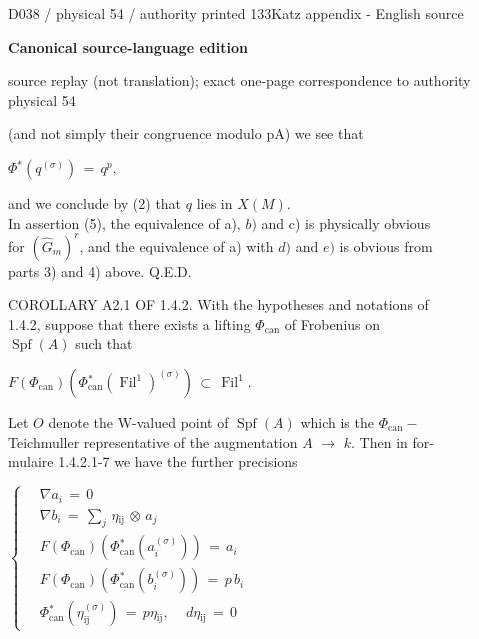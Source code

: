 \documentclass[9pt]{article}
\newcommand{\CanonHeading}[1]{\par\vspace{1.5pt}{\fontsize{8.6}{10.0}\selectfont\sffamily\bfseries\color{Accent} #1\par}\vspace{1.5pt}}
\newcommand{\CanonText}[1]{\par{\fontsize{8.0}{9.35}\selectfont\RaggedRight #1\par}\vspace{2.2pt}}
\newcommand{\CanonDisplay}[1]{\par\vspace{1.2pt}\begin{center}{\fontsize{7.2}{8.4}\selectfont\(\displaystyle #1\)}\end{center}\vspace{1.2pt}}
\newenvironment{CanonMathBlock}{\par\vspace{1.2pt}\begin{center}\fontsize{6.8}{8.0}\selectfont\(\displaystyle}{\)\end{center}\vspace{1.2pt}}
\newcommand{\LayerTitle}{Canonical source-language edition}
\begin{document}
\noindent\begin{minipage}[t][\dimexpr\textheight-5pt\relax][t]{\textwidth}
{\sffamily\fontsize{7.3}{8.2}\selectfont\color{Quiet} D038 / physical 54 / authority printed 133\hfill Katz appendix - English source}
\par{}\vspace{4.5pt}
{\sffamily\fontsize{10.4}{11.6}\selectfont\bfseries\color{Accent} \LayerTitle}
\par{\sffamily\fontsize{6.7}{7.7}\selectfont\color{Quiet} source replay (not translation); exact one-page correspondence to authority physical 54}
\vspace{5pt}
\CanonText{(and not simply their congruence modulo pA) we see that}
\CanonDisplay{\Phi{}^{*}(q^{(\sigma{})})\,=\,q^{p},}
\CanonText{and we conclude by (2) that \(q\) lies in \(X(M)\).\\In assertion (5), the equivalence of a), \(b)\) and c) is physically obvious\\for \((\widehat{G}_{m})^{r}\), and the equivalence of a) with \(d)\) and \(e)\) is obvious from\\parts 3) and 4) above. Q.E.D.}
\CanonHeading{A2. SHARPENINGS OF 1.4}
\CanonText{COROLLARY A2.1 OF 1.4.2. With the hypotheses and notations of\\1.4.2, suppose that there exists a lifting \(\Phi{}_{\mathrm{can}}\) of Frobenius on\\\(\operatorname{Spf}(A)\) such that}
\CanonDisplay{F(\Phi{}_{\mathrm{can}})(\Phi{}_{\mathrm{can}}^{*}(\operatorname{Fil}^{1})^{(\sigma{})})\,\subset{}\,\operatorname{Fil}^{1}.}
\CanonText{Let \(O\) denote the W-valued point of \(\operatorname{Spf}(A)\) which is the \(\Phi{}_{\mathrm{can}}-\)\\Teichmuller representative of the augmentation \(A\) \(\to{}\) \(k\). Then in for-\\mulaire 1.4.2.1-7 we have the further precisions}
\begin{CanonMathBlock}
\left\{\begin{aligned}
& \,\nabla{}a_{i}\,=\,0\\& \,\nabla{}b_{i}\,=\,\sum_{j}\,\eta{}_{\mathrm{ij}}\,\otimes{}\,a_{j}\\& \,F(\Phi{}_{\mathrm{can}})(\Phi{}_{\mathrm{can}}^{*}(a_{i}^{(\sigma{})}))\,=\,a_{i}\\& \,F(\Phi{}_{\mathrm{can}})(\Phi{}_{\mathrm{can}}^{*}(b_{i}^{(\sigma{})}))\,=\,p\,b_{i}\\& \,\Phi{}_{\mathrm{can}}^{*}(\eta{}_{\mathrm{ij}}^{(\sigma{})})\,=\,p\eta{}_{\mathrm{ij}},\quad\,d\eta{}_{\mathrm{ij}}\,=\,0

\end{aligned}
\end{CanonMathBlock}
\end{minipage}
\end{document}

